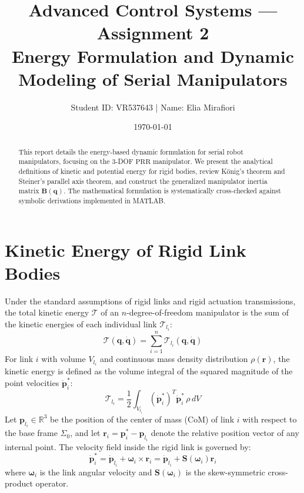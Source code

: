 \documentclass[11pt, a4paper]{article}
\title{\textbf{Advanced Control Systems --- Assignment 2\\Energy Formulation and Dynamic Modeling of Serial Manipulators}}
\author{Student ID: VR537643 \quad | \quad Name: Elia Mirafiori}
\date{\today}
\begin{document}
\maketitle

\begin{abstract}
This report details the energy-based dynamic formulation for serial robot manipulators, focusing on the 3-DOF $\mathrm{PRR}$ manipulator. We present the analytical definitions of kinetic and potential energy for rigid bodies, review König's theorem and Steiner's parallel axis theorem, and construct the generalized manipulator inertia matrix $\mathbf{B}(\mathbf{q})$. The mathematical formulation is systematically cross-checked against symbolic derivations implemented in MATLAB.
\end{abstract}

\section{Kinetic Energy of Rigid Link Bodies}
Under the standard assumptions of rigid links and rigid actuation transmissions, the total kinetic energy $\mathcal{T}$ of an $n$-degree-of-freedom manipulator is the sum of the kinetic energies of each individual link $\mathcal{T}_{l_i}$:
\begin{equation}
    \mathcal{T}(\mathbf{q}, \mathbf{\dot{q}}) = \sum_{i=1}^n \mathcal{T}_{l_i}(\mathbf{q}, \mathbf{\dot{q}})
\end{equation}
For link $i$ with volume $V_{l_i}$ and continuous mass density distribution $\rho(\mathbf{r})$, the kinetic energy is defined as the volume integral of the squared magnitude of the point velocities $\mathbf{\dot{p}}_i^*$:
\begin{equation}
    \mathcal{T}_{l_i} = \frac{1}{2} \int_{V_{l_i}} (\mathbf{\dot{p}}_i^*)^T \mathbf{\dot{p}}_i^* \, \rho \, dV
\end{equation}
Let $\mathbf{p}_{l_i} \in \mathbb{R}^3$ be the position of the center of mass (CoM) of link $i$ with respect to the base frame $\Sigma_0$, and let $\mathbf{r}_i = \mathbf{p}_i^* - \mathbf{p}_{l_i}$ denote the relative position vector of any internal point. The velocity field inside the rigid link is governed by:
\begin{equation}
    \mathbf{\dot{p}}_i^* = \mathbf{\dot{p}}_{l_i} + \boldsymbol{\omega}_i \times \mathbf{r}_i = \mathbf{\dot{p}}_{l_i} + \mathbf{S}(\boldsymbol{\omega}_i)\mathbf{r}_i
\end{equation}
where $\boldsymbol{\omega}_i$ is the link angular velocity and $\mathbf{S}(\boldsymbol{\omega}_i)$ is the skew-symmetric cross-product operator.
\end{document}
